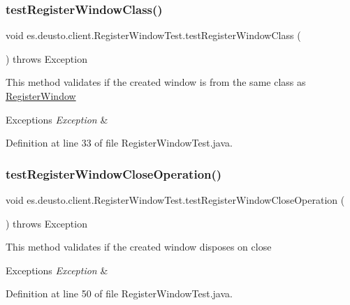 \subsubsection{\texorpdfstring{test\+Register\+Window\+Class()}{testRegisterWindowClass()}}
{\footnotesize\ttfamily void es.\+deusto.\+client.\+Register\+Window\+Test.\+test\+Register\+Window\+Class (\begin{DoxyParamCaption}{ }\end{DoxyParamCaption}) throws Exception}

This method validates if the created window is from the same class as \hyperlink{classes_1_1deusto_1_1client_1_1_register_window}{Register\+Window} 
\begin{DoxyExceptions}{Exceptions}
{\em Exception} & \\
\hline
\end{DoxyExceptions}


Definition at line 33 of file Register\+Window\+Test.\+java.

\mbox{\label{classes_1_1deusto_1_1client_1_1_register_window_test_acd9f26a04a5bc49f4366864e55df939d}} 
\subsubsection{\texorpdfstring{test\+Register\+Window\+Close\+Operation()}{testRegisterWindowCloseOperation()}}
{\footnotesize\ttfamily void es.\+deusto.\+client.\+Register\+Window\+Test.\+test\+Register\+Window\+Close\+Operation (\begin{DoxyParamCaption}{ }\end{DoxyParamCaption}) throws Exception}

This method validates if the created window disposes on close 
\begin{DoxyExceptions}{Exceptions}
{\em Exception} & \\
\hline
\end{DoxyExceptions}


Definition at line 50 of file Register\+Window\+Test.\+java.


